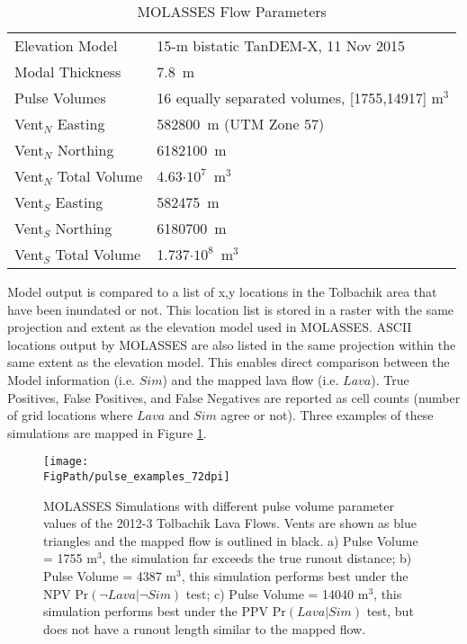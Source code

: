 		\begin{table}[h!]
		\centering
			\caption{MOLASSES Flow Parameters}
			\begin{tabular}{l l}
				\toprule
				Elevation Model & 15-m bistatic TanDEM-X, 11 Nov 2015\\
				Modal Thickness & 7.8~m\\
				Pulse Volumes & 16 equally separated volumes, [1755,14917] m$^3$\\
				\midrule
				Vent$_N$ Easting & 582800~m (UTM Zone 57)\\
				Vent$_N$ Northing & 6182100~m\\
				Vent$_N$ Total Volume & 4.63$\cdot10^7$~m$^3$\\
				\midrule
				Vent$_S$ Easting & 582475~m\\
				Vent$_S$ Northing & 6180700~m\\
				Vent$_S$ Total Volume & 1.737$\cdot10^8$~m$^3$\\
				\bottomrule
			\end{tabular}
			\label{tab_parameters_pulsebayes}
		\end{table}
		

		Model output is compared to a list of x,y locations in the Tolbachik area that have been inundated or not. This location list is stored in a raster with the same projection and extent as the elevation model used in MOLASSES. ASCII locations output by MOLASSES are also listed in the same projection within the same extent as the elevation model. This enables direct comparison between the Model information (i.e. $Sim$) and the mapped lava flow (i.e. $Lava$). True Positives, False Positives, and False Negatives are reported as cell counts (number of grid locations where $Lava$ and $Sim$ agree or not). Three examples of these simulations are mapped in Figure \ref{fig:pulse_map}.

		\begin{figure}
		\centering
		\texttt{[image: \\FigPath/pulse\_examples\_72dpi]}
		\caption[MOLASSES Simulations with different pulse volume parameter values of the 2012-3 Tolbachik Lava Flows]{MOLASSES Simulations with different pulse volume parameter values of the 2012-3 Tolbachik Lava Flows. Vents are shown as blue triangles and the mapped flow is outlined in black. a) Pulse Volume = 1755 m$^3$, the simulation far exceeds the true runout distance; b) Pulse Volume = 4387 m$^3$, this simulation performs best under the NPV $\text{Pr}(\neg Lava|\neg Sim)$ test; c) Pulse Volume = 14040 m$^3$, this simulation performs best under the PPV $\text{Pr}(Lava|Sim)$ test, but does not have a runout length similar to the mapped flow.}
		\label{fig:pulse_map}
		\end{figure}

